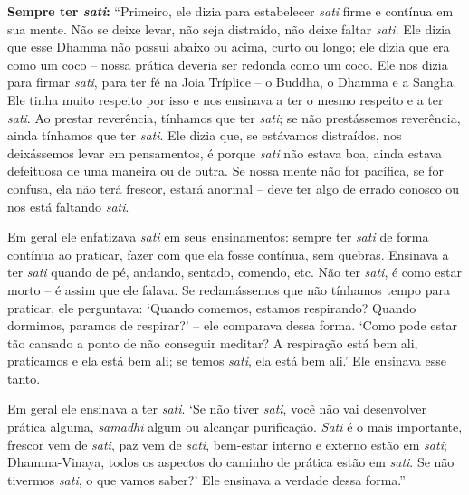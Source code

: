 \textbf{Sempre ter \emph{sati}:} ``Primeiro, ele dizia para estabelecer
\emph{sati} firme e contínua em sua mente. Não se deixe levar, não seja
distraído, não deixe faltar \emph{sati}. Ele dizia que esse Dhamma não possui
abaixo ou acima, curto ou longo; ele dizia que era como um coco -- nossa prática
deveria ser redonda como um coco. Ele nos dizia para firmar \emph{sati}, para
ter fé na Joia Tríplice -- o Buddha, o Dhamma e a Sangha. Ele tinha muito
respeito por isso e nos ensinava a ter o mesmo respeito e a ter \emph{sati}. Ao
prestar reverência, tínhamos que ter \emph{sati}; se não prestássemos
reverência, ainda tínhamos que ter \emph{sati}. Ele dizia que, se estávamos
distraídos, nos deixássemos levar em pensamentos, é porque \emph{sati} não
estava boa, ainda estava defeituosa de uma maneira ou de outra. Se nossa mente
não for pacífica, se for confusa, ela não terá frescor, estará anormal -- deve
ter algo de errado conosco ou nos está faltando \emph{sati}.

Em geral ele enfatizava \emph{sati} em seus ensinamentos: sempre ter
\emph{sati} de forma contínua ao praticar, fazer com que ela fosse
contínua, sem quebras. Ensinava a ter \emph{sati} quando de pé, andando,
sentado, comendo, etc. Não ter \emph{sati}, é como estar morto -- é
assim que ele falava. Se reclamássemos que não tínhamos tempo para
praticar, ele perguntava: `Quando comemos, estamos respirando? Quando
dormimos, paramos de respirar?' -- ele comparava dessa forma. `Como pode
estar tão cansado a ponto de não conseguir meditar? A respiração está
bem ali, praticamos e ela está bem ali; se temos \emph{sati}, ela está
bem ali.' Ele ensinava esse tanto.

Em geral ele ensinava a ter \emph{sati}. `Se não tiver \emph{sati}, você
não vai desenvolver prática alguma, \emph{samādhi} algum ou alcançar
purificação. \emph{Sati} é o mais importante, frescor vem de
\emph{sati}, paz vem de \emph{sati}, bem-estar interno e externo estão
em \emph{sati}; Dhamma-Vinaya, todos os aspectos do caminho de prática
estão em \emph{sati}. Se não tivermos \emph{sati}, o que vamos saber?'
Ele ensinava a verdade dessa forma.''

